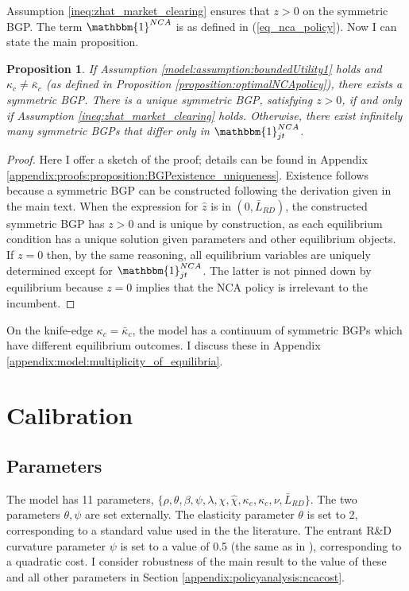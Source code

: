 \documentclass[ecta,nameyear,final]{econsocart}
\newtheorem{proposition}{Proposition}
\theoremstyle{definition}
\begin{document}
Assumption \ref{ineq:zhat_market_clearing} ensures that $z > 0$ on the symmetric BGP. The term $\mathbbm{1}^{NCA}$ is as defined in (\ref{eq_nca_policy}). Now I can state the main proposition.

\begin{proposition}\label{proposition:BGPexistence_uniqueness}
	If Assumption \ref{model:assumption:boundedUtility1} holds and $\kappa_c \ne \bar{\kappa}_c$ (as defined in Proposition \ref{proposition:optimalNCApolicy}), there exists a symmetric BGP. There is a unique symmetric BGP, satisfying $z > 0$, if and only if Assumption \ref{ineq:zhat_market_clearing} holds. Otherwise, there exist infinitely many symmetric BGPs that differ only in $\mathbbm{1}^{NCA}_{jt}$.
\end{proposition}

\begin{proof}
	Here I offer a sketch of the proof; details can be found in Appendix \ref{appendix:proofs:proposition:BGPexistence_uniqueness}. Existence follows because a symmetric BGP can be constructed following the derivation given in the main text. When the expression for $\hat{z}$ is in $(0,\bar{L}_{RD})$, the constructed symmetric BGP has $z > 0$ and is unique by construction, as each equilibrium condition has a unique solution given parameters and other equilibrium objects. If $z = 0$ then, by the same reasoning, all equilibrium variables are uniquely determined except for $\mathbbm{1}^{NCA}_{jt}$. The latter is not pinned down by equilibrium because $z = 0$ implies that the NCA policy is irrelevant to the incumbent.
\end{proof}

On the knife-edge $\kappa_c = \bar{\kappa}_c$, the model has a continuum of symmetric BGPs which have different equilibrium outcomes. I discuss these in Appendix \ref{appendix:model:multiplicity_of_equilibria}.

\section{Calibration}\label{sec:calibration}

\subsection{Parameters}

The model has 11 parameters, $\{\rho, \theta, \beta, \psi, \lambda, \chi, \hat{\chi}, \kappa_e, \kappa_c, \nu, \bar{L}_{RD}\}$. The two parameters $\theta, \psi$ are set externally. The elasticity parameter $\theta$ is set to 2, corresponding to a standard value used in the the literature. The entrant R\&D curvature parameter $\psi$ is set to a value of 0.5 (the same as in \cite{acemoglu_innovation_2015}), corresponding to a quadratic cost. I consider robustness of the main result to the value of these and all other parameters in Section \ref{appendix:policyanalysis:ncacost}.
\end{document}
